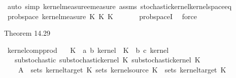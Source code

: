 \begin{isabellebody}
\ {\isacharparenleft}{\kern0pt}auto\ simp{\isacharcolon}{\kern0pt}\ kernel{\isacharunderscore}{\kern0pt}measure{\isacharunderscore}{\kern0pt}emeasure\ assms{\isacharparenleft}{\kern0pt}{}{\isacharparenright}{\kern0pt}\ stochastic{\isacharunderscore}{\kern0pt}kernel{\isachardot}{\kern0pt}kernel{\isacharunderscore}{\kern0pt}space{\isacharunderscore}{\kern0pt}eq{\isacharunderscore}{\kern0pt}{}{\isacharparenright}{\kern0pt}\isanewline
\ \ \isamarkupfalse%
\ \isamarkupfalse%
\ {\isachardoublequoteopen}prob{\isacharunderscore}{\kern0pt}space\ {\isacharparenleft}{\kern0pt}kernel{\isacharunderscore}{\kern0pt}measure\ {\isacharparenleft}{\kern0pt}K\ {\isasymcirc}\isactrlsub K\ K\ {\isasymomega}{\isacharparenright}{\kern0pt}{\isachardoublequoteclose}\isanewline
\ \ \ \ \isamarkupfalse%
\ prob{\isacharunderscore}{\kern0pt}spaceI\ \isamarkupfalse%
\ force\isanewline
{}\isamarkupfalse%
%
\endisatagproof
{\isafoldproof}%
%
\isadelimproof
%
\endisadelimproof
%
\begin{isamarkuptext}%
Theorem 14.29%
\end{isamarkuptext}\isamarkuptrue%
\isamarkupfalse%
\ kernel{\isacharunderscore}{\kern0pt}comp{\isacharunderscore}{\kern0pt}prod{\isacharcolon}{\kern0pt}\isanewline
\ \ \ K\ {\isacharcolon}{\kern0pt}{\isacharcolon}{\kern0pt}\ {\isachardoublequoteopen}{\isacharparenleft}{\kern0pt}{\isacharprime}{\kern0pt}a{\isacharcomma}{\kern0pt}\ {\isacharprime}{\kern0pt}b{\isacharparenright}{\kern0pt}\ kernel{\isachardoublequoteclose}\ \ K\ {\isacharcolon}{\kern0pt}{\isacharcolon}{\kern0pt}\ {\isachardoublequoteopen}{\isacharparenleft}{\kern0pt}{\isacharprime}{\kern0pt}b{\isacharcomma}{\kern0pt}\ {\isacharprime}{\kern0pt}c{\isacharparenright}{\kern0pt}\ kernel{\isachardoublequoteclose}\isanewline
\ \ \ substochastic{\isacharcolon}{\kern0pt}\ {\isachardoublequoteopen}substochastic{\isacharunderscore}{\kern0pt}kernel\ K\ {\isachardoublequoteopen}substochastic{\isacharunderscore}{\kern0pt}kernel\ K\isanewline
\ \ \ \ {\isachardoublequoteopen}A\ {\isasymin}\ sets\ {\isacharparenleft}{\kern0pt}kernel{\isacharunderscore}{\kern0pt}target\ K\ {\isachardoublequoteopen}sets\ {\isacharparenleft}{\kern0pt}kernel{\isacharunderscore}{\kern0pt}source\ K\ {\isacharequal}{\kern0pt}\ sets\ {\isacharparenleft}{\kern0pt}kernel{\isacharunderscore}{\kern0pt}target\ K\isanewline

\end{isabellebody}
